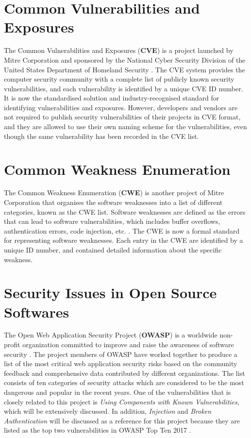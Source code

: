 \documentclass[12pt, a4paper]{report}
\begin{document}
\section{Common Vulnerabilities and Exposures}
The Common Vulnerabilities and Exposures (\textbf{CVE}) is a project launched by Mitre Corporation
and sponsored by the National Cyber Security Division of the United States Department of Homeland
Security \cite{cve}. The CVE system provides the computer security community with a complete list of
publicly known security vulnerabilities, and each vulnerability is identified by a unique CVE ID
number. It is now the standardised solution and industry-recognised standard for identifying
vulnerabilities and exposures. However, developers and vendors are not required to publish security
vulnerabilities of their projects in CVE format, and they are allowed to use their own naming scheme
for the vulnerabilities, even though the same vulnerability has been recorded in the CVE list.

\section{Common Weakness Enumeration}
The Common Weakness Enumeration (\textbf{CWE}) is another project of Mitre Corporation \cite{cwe}
that organises the software weaknesses into a list of different categories, known as the CWE list.
Software weaknesses are defined as the errors that can lead to software vulnerabilities, which
includes buffer overflows, authentication errors, code injection, etc. \cite{cwe_faq}. The CWE is
now a formal standard for representing software weaknesses. Each entry in the CWE are identified by
a unique ID number, and contained detailed information about the specific weakness.

\section{Security Issues in Open Source Softwares}
The Open Web Application Security Project (\textbf{OWASP}) is a worldwide non-profit organization
committed to improve and raise the awareness of software security \cite{owasp_home}. The project
members of OWASP have worked together to produce a list of the most critical web application
security risks based on the community feedback and comprehensive data contributed by different
organizations. The list consists of ten categories of security attacks which are considered to be
the most dangerous and popular in the recent years. One of the vulnerabilities that is closely
related to this project is \textit{Using Components with Known Vulnerabilities}, which will be
extensively discussed. In addition, \textit{Injection} and \textit{Broken Authentication} will be
discussed as a reference for this project because they are listed as the top two vulnerabilities in
OWASP Top Ten 2017 \cite{owasp_top10}.
\end{document}
